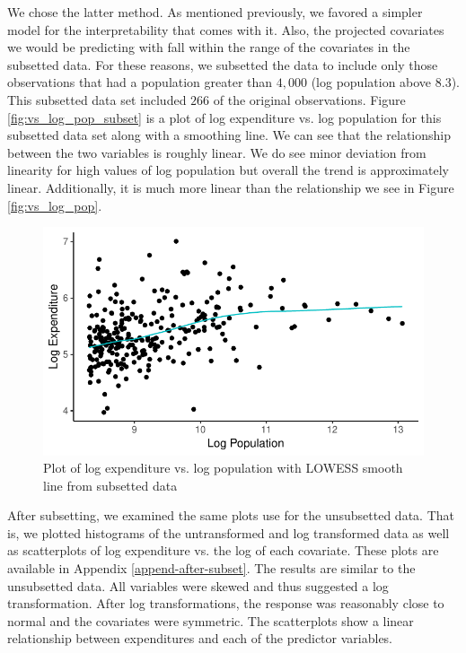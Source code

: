\documentclass{article}\usepackage[]{graphicx}\usepackage[]{color}
\makeatletter
\def\maxwidth{ %
  \ifdim\Gin@nat@width>\linewidth
    \linewidth
  \else
    \Gin@nat@width
  \fi
}
\newenvironment{knitrout}{}{} %
\makeatother
\begin{document}
We chose the latter method. As mentioned previously, we favored a simpler model for the interpretability that comes with it. Also, the projected covariates we would be predicting with fall within the range of the covariates in the subsetted data. For these reasons, we subsetted the data to include only those observations that had a population greater than $4,000$ (log population above $8.3$). This subsetted data set included $266$ of the original observations. Figure \ref{fig:vs_log_pop_subset} is a plot of log expenditure vs. log population for this subsetted data set along with a smoothing line. We can see that the relationship between the two variables is roughly linear. We do see minor deviation from linearity for high values of log population but overall the trend is approximately linear. Additionally, it is much more linear than the relationship we see in Figure \ref{fig:vs_log_pop}.

\begin{knitrout}
\color{fgcolor}\begin{figure}[h]
\includegraphics[width=\maxwidth]{figure/r_fig_vs_log_pop_subset-1} \caption{\label{fig:vs_log_pop_subset} Plot of log expenditure vs. log population with LOWESS smooth line from subsetted data}\label{fig:r fig_vs_log_pop_subset}
\end{figure}


\end{knitrout}


After subsetting, we examined the same plots use for the unsubsetted data. That is, we plotted histograms of the untransformed and log transformed data as well as scatterplots of log expenditure vs. the log of each covariate. These plots are available in Appendix \ref{append-after-subset}. The results are similar to the unsubsetted data. All variables were skewed and thus suggested a log transformation. After log transformations, the response was reasonably close to normal and the covariates were symmetric. The scatterplots show a linear relationship between expenditures and each of the predictor variables.
\end{document}
